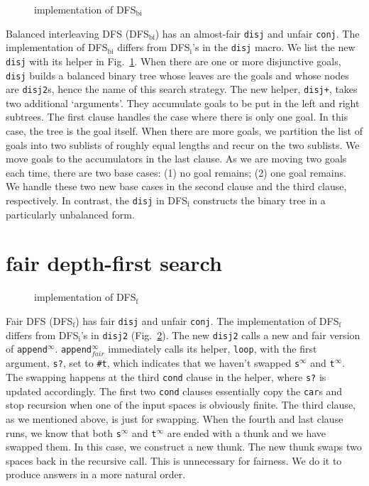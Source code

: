 \documentclass[format=acmlarge, review=true, authordraft=true]{acmart}
\newcommand{\conj}{\texttt{conj}}
\newcommand{\disj}{\texttt{disj}}
\newcommand{\DFSi }[0]{DFS$_\textrm{i}$}
\newcommand{\DFSf }[0]{DFS$_\textrm{f}$}
\newcommand{\DFSbi}[0]{DFS$_\textrm{bi}$}
\begin{document}
\begin{figure}
	
	\caption{implementation of \DFSbi{}}
	\label{balanced-disj}
\end{figure}

Balanced interleaving DFS (\DFSbi{}) has an almost-fair \disj{} and unfair 
\conj{}. The implementation of \DFSbi{} differs from 
\DFSi{}'s in the \disj{} macro. We list the new \disj{} with its 
helper in Fig.~\ref{balanced-disj}. When there are one or more disjunctive 
goals, \disj{} builds a balanced binary tree whose leaves are the goals and 
whose nodes are \texttt{disj2}s, hence the name of this search strategy. 
The new helper, \texttt{disj+}, takes two additional `arguments'. They 
accumulate goals to be put in the left and right subtrees. The first clause 
handles the case where there is only one goal. In this case, the tree is the 
goal itself. When there are more goals, we partition the list of goals 
into two sublists of roughly equal lengths and recur on the two sublists. We 
move goals to the accumulators in the last clause. As we are moving 
two goals each time, there are two base cases: (1) no goal remains; (2) one 
goal remains. We handle these two new base cases in the second clause and the 
third clause, respectively. In contrast, the \disj{} in \DFSi{} constructs the 
binary tree in a particularly unbalanced form.

\section{fair depth-first search}

\begin{figure}
	
	\caption{implementation of \DFSf{}}
	\label{fDFS}
\end{figure}

Fair DFS (\DFSf) has fair \disj{} and unfair \conj{}. The 
implementation of \DFSf{} differs from \DFSi{}'s in 
\texttt{disj2} (Fig.~\ref{fDFS}). The new \texttt{disj2} calls a new and 
fair version of \texttt{append$^\infty$}. \texttt{append$^\infty_{fair}$} 
immediately 
calls 
its helper, \texttt{loop}, with the first argument, \texttt{s?}, set to 
\texttt{\#{}t}, which indicates that we haven't swapped
\texttt{s$^\infty$} and \texttt{t$^\infty$}. The swapping 
happens at 
the third \texttt{cond} clause in the helper, where \texttt{s?} is updated 
accordingly. The first two \texttt{cond} clauses essentially copy the 
\texttt{car}s and stop recursion when one of the input spaces is obviously 
finite. The third clause, as we mentioned above, is just for swapping. When the 
fourth and last clause runs, we know that both \texttt{s$^\infty$} and 
\texttt{t$^\infty$} are ended with a thunk and we have swapped them. In this 
case, we construct a new thunk. The new thunk swaps two spaces back in the
recursive call. This is unnecessary for fairness. We do it to produce answers 
in a more natural order.
\end{document}
